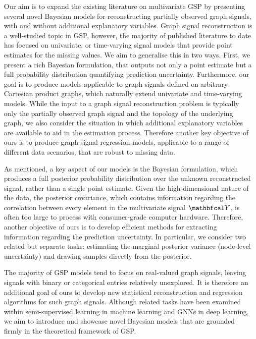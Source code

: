 Our aim is to expand the existing literature on multivariate GSP by presenting several novel Bayesian models for reconstructing partially observed graph signals, with and without additional explanatory variables. Graph signal reconstruction is a well-studied topic in GSP, however, the majority of published literature to date has focused on univariate, or time-varying signal models that provide point estimates for the missing values. We aim to generalise this in two ways. First, we present a rich Bayesian formulation, that outputs not only a point estimate but a full probability distribution quantifying prediction uncertainty. Furthermore, our goal is to produce models applicable to graph signals defined on arbitrary Cartesian product graphs, which naturally extend univariate and time-varying models. While the input to a graph signal reconstruction problem is typically only the partially observed graph signal and the topology of the underlying graph, we also consider the situation in which additional explanatory variables are available to aid in the estimation process. Therefore another key objective of ours is to produce graph signal regression models, applicable to a range of different data scenarios, that are robust to missing data. 


As mentioned, a key aspect of our models is the Bayesian formulation, which produces a full posterior probability distribution over the unknown reconstructed signal, rather than a single point estimate. Given the high-dimensional nature of the data, the posterior covariance, which contains information regarding the correlation between every element in the multivariate signal $\Yt$, is often too large to process with consumer-grade computer hardware. Therefore, another objective of ours is to develop efficient methods for extracting information regarding the prediction uncertainty. In particular, we consider two related but separate tasks: estimating the marginal posterior variance (node-level uncertainty) and drawing samples directly from the posterior. 


The majority of GSP models tend to focus on real-valued graph signals, leaving signals with binary or categorical entries relatively unexplored. It is therefore an additional goal of ours to develop new statistical reconstruction and regression algorithms for such graph signals. Although related tasks have been examined within semi-supervised learning in machine learning and GNNs in deep learning, we aim to introduce and showcase novel Bayesian models that are grounded firmly in the theoretical framework of GSP.

